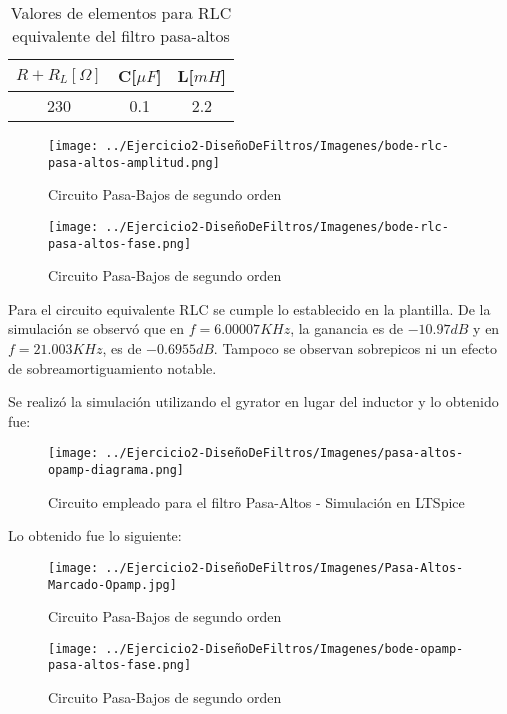 \begin{table}[H]
    \centering
    \begin{tabular}{|c|c|c|}
    \hline
    \rowcolor[HTML]{C0C0C0} 
    $R+R_L[\Omega]$ & C[$\mu F$] & L[$mH$]  \\ \hline
    230      & 0.1  & 2.2 \\ \hline
    \end{tabular}
    \caption{Valores de elementos para RLC equivalente del filtro pasa-altos}
    \end{table}

\begin{figure}[H]
    \centering
    \texttt{[image: ../Ejercicio2-DiseñoDeFiltros/Imagenes/bode-rlc-pasa-altos-amplitud.png]}
    \caption{Circuito Pasa-Bajos de segundo orden}
\end{figure}

\begin{figure}[H]
    \centering
    \texttt{[image: ../Ejercicio2-DiseñoDeFiltros/Imagenes/bode-rlc-pasa-altos-fase.png]}
    \caption{Circuito Pasa-Bajos de segundo orden}
\end{figure}

Para el circuito equivalente RLC se cumple lo establecido en la plantilla.
De la simulación se observó que en $f=6.00007 KHz$, la ganancia es de $-10.97 dB$ y en $f=21.003KHz$, es de $-0.6955 dB$.
Tampoco se observan sobrepicos ni un efecto de sobreamortiguamiento notable.

Se realizó la simulación utilizando el gyrator en lugar del inductor y lo obtenido fue:

\begin{figure}[H]
    \centering
    \texttt{[image: ../Ejercicio2-DiseñoDeFiltros/Imagenes/pasa-altos-opamp-diagrama.png]}
    \caption{Circuito empleado para el filtro Pasa-Altos - Simulación en LTSpice}
\end{figure}

Lo obtenido fue lo siguiente:

\begin{figure}[H]
    \centering
    \texttt{[image: ../Ejercicio2-DiseñoDeFiltros/Imagenes/Pasa-Altos-Marcado-Opamp.jpg]}
    \caption{Circuito Pasa-Bajos de segundo orden}
\end{figure}

\begin{figure}[H]
    \centering
    \texttt{[image: ../Ejercicio2-DiseñoDeFiltros/Imagenes/bode-opamp-pasa-altos-fase.png]}
    \caption{Circuito Pasa-Bajos de segundo orden}
\end{figure}


